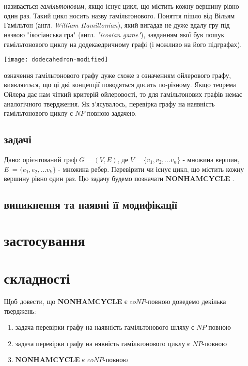 \documentclass[14pt]{article}
\begin{document}
\begin{spacing}{1.175}
    \section{}
         називається \textit{гамільтоновим}, якщо існує цикл, що містить кожну вершину рівно один раз. Такий цикл носить назву гамільтонового.
        Поняття пішло від Вільям Гамільтон (англ. \textit{William Hamiltonian}), який вигадав не дуже вдалу гру під назвою "ікосіанська гра" (англ. \textit{"icosian game"}), завданням якої був пошук гамільтонового циклу на додекаедричному графі (і можливо на його підграфах). \\
        \begin{center}
        \texttt{[image: dodecahedron-modified]} \\
        \end{center}
         означення гамільтонового графу дуже схоже з означенням ойлерового графу, виявляється, що ці дві концепції поводяться досить по-різному. Якщо теорема Ойлера дає нам чіткий критерій ойлеровості, то для гамільтонових графів немає аналогічного твердження. Як з'ясувалось, перевірка графу на наявність гамільтонового циклу є \(NP\)-повною задачею.

        \newcommand{\nonhamcycle}{\textbf{NONHAMCYCLE }}
        \subsection{ задачі}
        \quad Дано: орієнтований граф \(G = (V,E)\), де \(V = \{v_1, v_2, \dots v_n\}\) - множина вершин, \(E\ = \{e_1, e_2, \dots v_k\}\) - множина ребер. Перевірити чи існує цикл, що містить кожну вершину рівно один раз. Цю задачу будемо позначати \nonhamcycle .    
        \subsection{ виникнення та наявні її модифікації}
    
    \section{ застосування}
    
    \section{ складності}
        \quad Щоб довести, що \nonhamcycle є \(coNP\)-повною доведемо декілька тверджень: 
        \begin{enumerate}
            \item задача перевірки графу на наявність гамільтонового шляху є \(NP\)-повною
            \item задача перевірки графу на нявність гамільтонового циклу є \(NP\)-повною
            \item \nonhamcycle є \(coNP\)-повною
        \end{enumerate}\\
        

\end{spacing}
\end{document}
